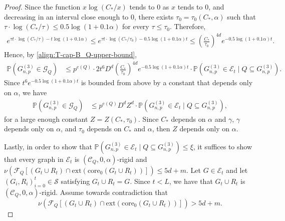 \documentclass[11pt,a4paper,oneside,reqno]{amsart}
\newcommand{\Gnp}{G_{n, p}^{(3)}}
\newcommand{\cC}{\mathcal{C}}
\newcommand{\cE}{\mathcal{E}}
\newcommand{\cF}{\mathcal{F}}
\newcommand{\cG}{\mathcal{G}}
\newcommand{\cS}{\mathcal{S}}
\renewcommand{\Pr}{\mathbb{P}}
\newcommand{\1}{\mathbbm{1}} %
\renewcommand{\le}{\leqslant}
\newcommand{\ext}{\mathrm{ext}}
\newcommand{\core}{\mathrm{core}}
\begin{document}
\begin{proof}
    Since the function $x \log(C_{*}/x)$ tends to $0$ as $x$ tends to $0$, and decreasing in an interval close enough to $0$, there exists $\tau_0 = \tau_0(C_{*}, \alpha)$ such that $\tau \cdot \log(C_{*} / \tau) \le 0.5\log\left(1+0.1\alpha\right)$ for every $\tau \le 
    \tau_0$.     
    Therefore,
    \begin{align*}
        e^{\tau t \cdot \log(C_{*}/\tau) - t \log\left(1+0.1\alpha\right)} \le e^{\tau t \cdot \log(C_{*}/\tau_0) - 0.5\log\left(1+0.1\alpha\right) t} \le \left(\frac{C_{*}}{\tau_0}\right)^{4d} e^{- 0.5 \log\left(1+0.1\alpha\right) t}.
    \end{align*}
    Hence, by \eqref{align:T-cap-B_Q-upper-bound},
    \begin{align*}
        \Pr\left(\Gnp \in \cG_Q\right) &\le p^{e(Q)} \cdot 2 t^{6} D^{d} \left(\frac{C_{*}}{\tau_0}\right)^{4d} e^{- 0.5 \log\left(1+0.1\alpha\right) t} \cdot \Pr\left(\Gnp \in \cE_t \mid Q \subseteq \Gnp\right).
    \end{align*}
    Since $t^{6} e^{- 0.5 \log\left(1+0.1\alpha\right) t}$ is bounded from above by a constant that depends only on $\alpha$, we have
    \begin{align*}
        \Pr\left(\Gnp \in \cG_Q\right) &\le p^{e(Q)} D^{d} Z^{d} \cdot \Pr\left(\Gnp \in \cE_t \mid Q \subseteq \Gnp\right),
    \end{align*}
    for a large enough constant $Z = Z(C_{*}, \tau_0)$. Since $C_{*}$ depends on $\alpha$ and $\gamma$, $\gamma$ depends only on $\alpha$, and $\tau_0$ depends on $C_*$ and $\alpha$, then $Z$ depends only on $\alpha$.

    Lastly, in order to show that $\Pr\left(\Gnp \in \cE_t \mid Q \subseteq \Gnp\right) \le \xi$, it suffices to show that every graph in $\cE_t$ is $(\cC_Q, 0, \alpha)$-rigid and $\nu\left(\cF_Q\left[(G_t \cup R_t) \cap \ext\left(\core_0(G_t \cup R_t)\right)\right]\right) \le 5d + m$. Let $G \in \cE_t$ and let $(G_i, R_i)_{i=0}^{t} \in \cS$ satisfying $G_t \cup R_t = G$. Since $t < L$, we have that $G_t \cup R_t$ is $(\cC_Q, 0, \alpha)$-rigid. Assume towards contradiction that 
    \[
        \nu\left(\cF_Q\left[(G_t \cup R_t) \cap \ext\left(\core_0(G_t \cup R_t)\right)\right]\right) > 5d + m.
    \] 


\end{proof}
\end{document}
